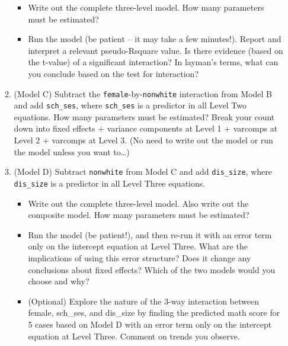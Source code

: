 \documentclass[
]{krantz}
\providecommand{\tightlist}{%
  \setlength{\itemsep}{0pt}\setlength{\parskip}{0pt}}
\begin{document}
\begin{enumerate}
\begin{enumerate}
    \begin{itemize}
    \tightlist
    \item
      Write out the complete three-level model. How many parameters must be estimated?\\
    \item
      Run the model (be patient -- it may take a few minutes!). Report and interpret a relevant pseudo-Rsquare value. Is there evidence (based on the t-value) of a significant interaction? In layman's terms, what can you conclude based on the test for interaction?
    \end{itemize}
  \item
    (Model C) Subtract the \texttt{female}-by-\texttt{nonwhite} interaction from Model B and add \texttt{sch\_ses}, where \texttt{sch\_ses} is a predictor in all Level Two equations. How many parameters must be estimated? Break your count down into fixed effects + variance components at Level 1 + varcomps at Level 2 + varcomps at Level 3. (No need to write out the model or run the model unless you want to\ldots)
  \item
    (Model D) Subtract \texttt{nonwhite} from Model C and add \texttt{dis\_size}, where \texttt{dis\_size} is a predictor in all Level Three equations.

    \begin{itemize}
    \tightlist
    \item
      Write out the complete three-level model. Also write out the composite model. How many parameters must be estimated?
    \item
      Run the model (be patient!), and then re-run it with an error term only on the intercept equation at Level Three. What are the implications of using this error structure? Does it change any conclusions about fixed effects? Which of the two models would you choose and why?
    \item
      (Optional) Explore the nature of the 3-way interaction between female, sch\_ses, and dis\_size by finding the predicted math score for 5 cases based on Model D with an error term only on the intercept equation at Level Three. Comment on trends you observe.


\end{itemize}
\end{enumerate}
\end{enumerate}
\end{document}
